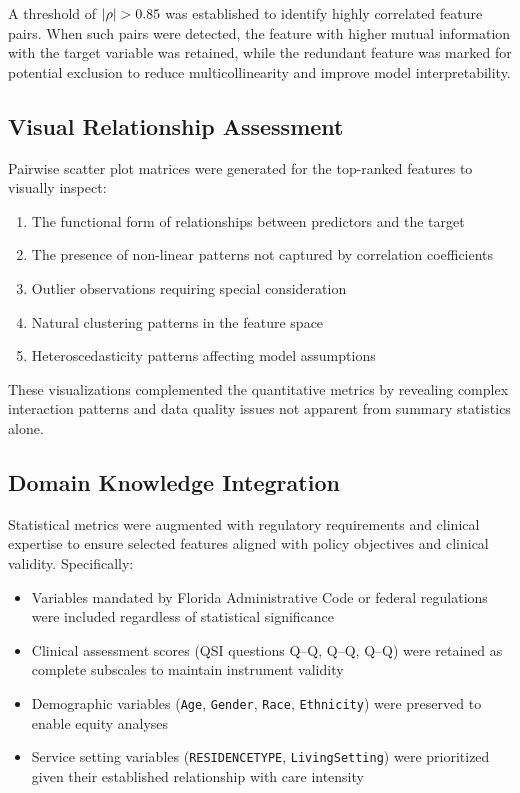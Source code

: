 A threshold of $|\rho| > 0.85$ was established to identify highly correlated feature pairs. When such pairs were detected, the feature with higher mutual information with the target variable was retained, while the redundant feature was marked for potential exclusion to reduce multicollinearity and improve model interpretability.

\subsection{Visual Relationship Assessment}
\label{subsec:visual-assessment}

Pairwise scatter plot matrices were generated for the top-ranked features to visually inspect:
\begin{enumerate}
    \item The functional form of relationships between predictors and the target
    \item The presence of non-linear patterns not captured by correlation coefficients
    \item Outlier observations requiring special consideration
    \item Natural clustering patterns in the feature space
    \item Heteroscedasticity patterns affecting model assumptions
\end{enumerate}

These visualizations complemented the quantitative metrics by revealing complex interaction patterns and data quality issues not apparent from summary statistics alone.

\subsection{Domain Knowledge Integration}
\label{subsec:domain-knowledge}

Statistical metrics were augmented with regulatory requirements and clinical expertise to ensure selected features aligned with policy objectives and clinical validity. Specifically:

\begin{itemize}
    \item Variables mandated by Florida Administrative Code or federal regulations were included regardless of statistical significance
    \item Clinical assessment scores (QSI questions Q\FSQSIFunctionalStart--Q\FSQSIFunctionalEnd, Q\FSQSIBehavioralStart--Q\FSQSIBehavioralEnd, Q\FSQSIPhysicalStart--Q\FSQSIPhysicalEnd) were retained as complete subscales to maintain instrument validity
    \item Demographic variables (\texttt{Age}, \texttt{Gender}, \texttt{Race}, \texttt{Ethnicity}) were preserved to enable equity analyses
    \item Service setting variables (\texttt{RESIDENCETYPE}, \texttt{LivingSetting}) were prioritized given their established relationship with care intensity
\end{itemize}

